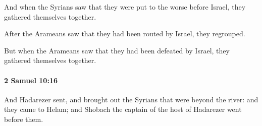 			\begin{versebox}
					\item[BHS] 
					\item[ASV] And when the Syrians saw that they were put to the worse before Israel, they gathered themselves together.
					\item[NIV] After the Arameans saw that they had been routed by Israel, they regrouped.
					\item[NRSV] But when the Arameans saw that they had been defeated by Israel, they gathered themselves together.
			\end{versebox}

		\paragraph{2 Samuel 10:16} %
			\label{2SAMUEL-10-16}

			And Hadarezer sent, and brought out the Syrians that were beyond the river: and they came to Helam; and Shobach the captain of the host of Hadarezer went before them.

